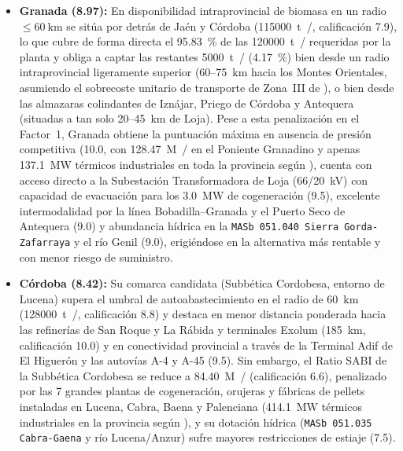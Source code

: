\documentclass{report}
\begin{document}
\begin{itemize}
    \item \textbf{Granada (\num{8.97}):} En disponibilidad intraprovincial de biomasa en un radio $\le \SI{60}{\kilo\metre}$ se sitúa por detrás de Jaén y Córdoba (\SI{115000}{\tonne{}/}, calificación \num{7.9}), lo que cubre de forma directa el \SI{95.83}{\percent} de las \SI{120000}{\tonne{}/} requeridas por la planta y obliga a captar las restantes \SI{5000}{\tonne{}/} (\SI{4.17}{\percent}) bien desde un radio intraprovincial ligeramente superior (\num{60}--\SI{75}{\kilo\metre} hacia los Montes Orientales, asumiendo el sobrecoste unitario de transporte de Zona~III de \textcite{Ronda2027}), o bien desde las almazaras colindantes de Iznájar, Priego de Córdoba y Antequera (situadas a tan solo \num{20}--\SI{45}{\kilo\metre} de Loja). Pese a esta penalización en el Factor~1, Granada obtiene la puntuación máxima en ausencia de presión competitiva (\num{10.0}, con \SI{128.47}{M/} en el Poniente Granadino y apenas \SI{137.1}{\mega\watt} térmicos industriales en toda la provincia según \textcite{AAE2026}), cuenta con acceso directo a la Subestación Transformadora de Loja (66/20~kV) con capacidad de evacuación para los \SI{3.0}{\mega\watt} de cogeneración (\num{9.5}), excelente intermodalidad por la línea Bobadilla--Granada y el Puerto Seco de Antequera (\num{9.0}) y abundancia hídrica en la \texttt{MASb 051.040 Sierra Gorda-Zafarraya} y el río Genil (\num{9.0}), erigiéndose en la alternativa más rentable y con menor riesgo de suministro.
    \item \textbf{Córdoba (\num{8.42}):} Su comarca candidata (Subbética Cordobesa, entorno de Lucena) supera el umbral de autoabastecimiento en el radio de \SI{60}{\kilo\metre} (\SI{128000}{\tonne{}/}, calificación \num{8.8}) y destaca en menor distancia ponderada hacia las refinerías de San Roque y La Rábida y terminales Exolum (\SI{185}{\kilo\metre}, calificación \num{10.0}) y en conectividad provincial a través de la Terminal Adif de El Higuerón y las autovías A-4 y A-45 (\num{9.5}). Sin embargo, el Ratio SABI de la Subbética Cordobesa se reduce a \SI{84.40}{M/} (calificación \num{6.6}), penalizado por las \num{7} grandes plantas de cogeneración, orujeras y fábricas de pellets instaladas en Lucena, Cabra, Baena y Palenciana (\SI{414.1}{\mega\watt} térmicos industriales en la provincia según \textcite{AAE2026}), y su dotación hídrica (\texttt{MASb 051.035 Cabra-Gaena} y río Lucena/Anzur) sufre mayores restricciones de estiaje (\num{7.5}).

\end{itemize}
\end{document}
